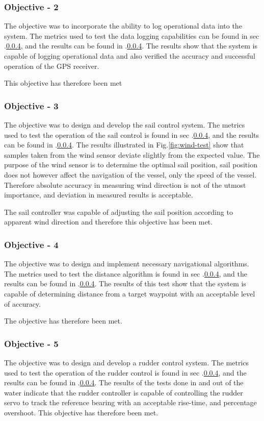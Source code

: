 \subsubsection{Objective - 2}
The objective was to incorporate the ability to log operational data into the system. The metrics used to test the data logging capabilities can be found in sec .\ref{},
and the results can be found in .\ref{}. The results show that the system is capable of logging operational data and also verified the accuracy and successful operation of the 
GPS receiver.

This objective has therefore been met

\subsubsection{Objective - 3}
The objective was to design and develop the sail control system. The metrics used to test the operation of the sail control is found in sec .\ref{},
and the results can be found in .\ref{}. The results illustrated in Fig.\ref{fig:wind-test} show that samples taken from the wind sensor deviate slightly from the expected value.
The purpose of the wind sensor is to determine the optimal sail position, sail position does not however affect the navigation
of the vessel, only the speed of the vessel. Therefore absolute accuracy in measuring wind direction is not of the utmost importance, and deviation in measured results is acceptable.


The sail controller was capable of adjusting the sail position according to apparent wind direction and therefore this objective has been met.

\subsubsection{Objective - 4}
The objective was to design and implement necessary navigational algorithms. The metrics used to test the distance algorithm is found in sec .\ref{},
and the results can be found in .\ref{}. The results of this test show that the system is capable of determining distance from a target waypoint with an acceptable level of accuracy. 

The objective has therefore been met.

\subsubsection{Objective - 5}
The objective was to design and develop a rudder control system. The metrics used to test the operation of the rudder control is found in sec .\ref{},
and the results can be found in .\ref{}. The results of the tests done in and out of the water indicate that the rudder controller is capable of controlling the rudder servo to track the 
reference bearing with an acceptable rise-time, and percentage overshoot.
This objective has therefore been met.

